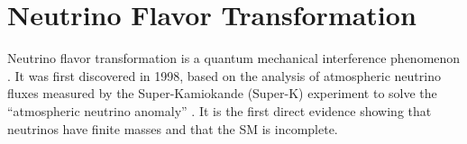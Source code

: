 
\section{Neutrino Flavor Transformation}
Neutrino flavor transformation is a quantum mechanical interference phenomenon \cite{akhmedov2019quantum}. It was first discovered in 1998, based on the analysis of atmospheric neutrino fluxes measured by the Super-Kamiokande (Super-K) experiment to solve the ``atmospheric neutrino anomaly'' \cite{fukuda1998evidence}. It is the first direct evidence showing that neutrinos have finite masses and that the SM is incomplete.

